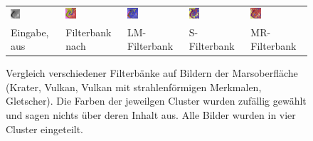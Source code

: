 \begin{figure}[h!]
\begin{tabular}{p{}p{}p{}p{}p{}}
	\includegraphics[width=0.2\textwidth]{images/Gre13_05.jpg} &
	\includegraphics[width=0.2\textwidth]{images/gen/GEN_filterbanks_Gre13_05_TSUGF.png} &
	\includegraphics[width=0.2\textwidth]{images/gen/GEN_filterbanks_Gre13_05_LM.png} &
	\includegraphics[width=0.2\textwidth]{images/gen/GEN_filterbanks_Gre13_05_S.png} &
	\includegraphics[width=0.2\textwidth]{images/gen/GEN_filterbanks_Gre13_05_MR.png} \\
	
	\centering Eingabe, aus \cite{greeley_13} &
	\centering Filterbank nach \cite{jain_91} &
	\centering LM-Filterbank \cite{leung_01} &
	\centering S-Filterbank \cite{schmid_01} &
	\centering MR-Filterbank \cite{visgeo} \\
\end{tabular}
\caption{Vergleich verschiedener Filterbänke auf Bildern der Marsoberfläche (Krater, Vulkan, Vulkan mit strahlenförmigen Merkmalen, Gletscher). Die Farben der jeweilgen Cluster wurden zufällig gewählt und sagen nichts über deren Inhalt aus. Alle Bilder wurden in vier Cluster eingeteilt.}
\label{fig:filterbank_comparision}
\end{figure}

